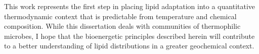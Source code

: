 
This work represents the first step in placing lipid adaptation into a quantitative thermodynamic context that is predictable from temperature and chemical composition. While this dissertation deals with communities of thermophilic microbes, I hope that the bioenergetic principles described herein will contribute to a better understanding of lipid distributions in a greater geochemical context.